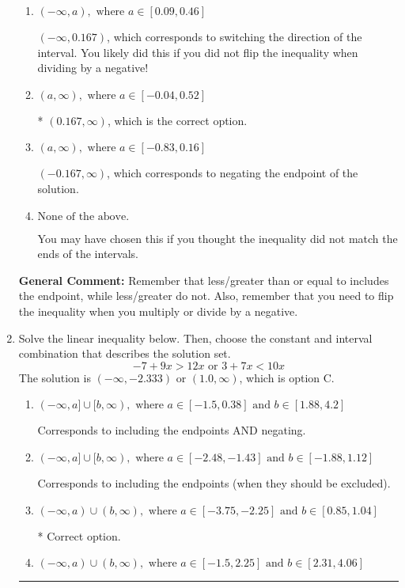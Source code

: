 \documentclass{extbook}[14pt]
\newcommand{\litem}[1]{\item #1

\rule{\textwidth}{0.4pt}}
\begin{document}
\begin{enumerate}
{\begin{enumerate}[label=\Alph*.]
 $(-\infty, -0.167)$, which corresponds to switching the direction of the interval AND negating the endpoint. You likely did this if you did not flip the inequality when dividing by a negative as well as not moving values over to a side properly.
\item \( (-\infty, a), \text{ where } a \in [0.09, 0.46] \)

 $(-\infty, 0.167)$, which corresponds to switching the direction of the interval. You likely did this if you did not flip the inequality when dividing by a negative!
\item \( (a, \infty), \text{ where } a \in [-0.04, 0.52] \)

* $(0.167, \infty)$, which is the correct option.
\item \( (a, \infty), \text{ where } a \in [-0.83, 0.16] \)

 $(-0.167, \infty)$, which corresponds to negating the endpoint of the solution.
\item \( \text{None of the above}. \)

You may have chosen this if you thought the inequality did not match the ends of the intervals.
\end{enumerate}

\textbf{General Comment:} Remember that less/greater than or equal to includes the endpoint, while less/greater do not. Also, remember that you need to flip the inequality when you multiply or divide by a negative.
}
\litem{
Solve the linear inequality below. Then, choose the constant and interval combination that describes the solution set.
\[ -7 + 9 x > 12 x \text{ or } 3 + 7 x < 10 x \]The solution is \( (-\infty, -2.333) \text{ or } (1.0, \infty) \), which is option C.\begin{enumerate}[label=\Alph*.]
\item \( (-\infty, a] \cup [b, \infty), \text{ where } a \in [-1.5, 0.38] \text{ and } b \in [1.88, 4.2] \)

Corresponds to including the endpoints AND negating.
\item \( (-\infty, a] \cup [b, \infty), \text{ where } a \in [-2.48, -1.43] \text{ and } b \in [-1.88, 1.12] \)

Corresponds to including the endpoints (when they should be excluded).
\item \( (-\infty, a) \cup (b, \infty), \text{ where } a \in [-3.75, -2.25] \text{ and } b \in [0.85, 1.04] \)

 * Correct option.
\item \( (-\infty, a) \cup (b, \infty), \text{ where } a \in [-1.5, 2.25] \text{ and } b \in [2.31, 4.06] \)


\end{enumerate}}
\end{enumerate}
\end{document}

